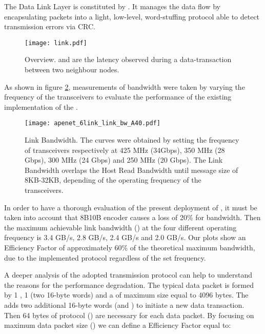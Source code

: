 The Data Link Layer is constituted by . It manages the
data flow by encapsulating packets into a light, low-level,
word-stuffing protocol able to detect transmission errors via CRC.

\begin{figure}[!hbt]
  \centering
  \texttt{[image: link.pdf]}
  \caption{ Overview.  and  are the
  latency observed during a data-transaction between two neighbour
  nodes.}
  \label{fig:link}
\end{figure}


As shown in figure \ref{fig:link_bw}, measurements of bandwidth were
taken by varying the frequency of the transceivers to evaluate the
performance of the existing implementation of the .
 
\begin{figure}[!hbt]
  \centering
  \texttt{[image: apenet\_6link\_link\_bw\_A40.pdf]}
  \caption{\apenetp Link Bandwidth. The curves were obtained by
    setting the frequency of transceivers respectively at 425 MHz
    (34Gbps), 350 MHz (28 Gbps), 300 MHz (24 Gbps) and 250 MHz (20
    Gbps). The Link Bandwidth  overlaps the Host Read
    Bandwidth  until message size of 8KB-32KB,
    depending of the operating frequency of the transceivers.}
  \label{fig:link_bw}
\end{figure}


In order to have a thorough evaluation of the present deployment of
, it must be taken into account that 8B10B encoder
causes a loss of 20\% for bandwidth. Then the maximum achievable link
bandwidth () at the four different operating frequency
is 3.4 GB/s, 2.8 GB/s, 2.4 GB/s and 2.0 GB/s.
Our plots show an Efficiency Factor  of approximately 60\% of
the theoretical maximum bandwidth, due to the implemented protocol
regardless of the set frequency.


A deeper analysis of the adopted transmission protocol can help to
understand the reasons for the performance degradation. The typical
\apenetp data packet is formed by 1 \header, 1 \footer (two 16-byte
words) and a \payload of maximum size equal to 4096 bytes.
The  adds two additional 16-byte words (\magic and
\start) to initiate a new data transaction. Then 64 bytes of protocol
() are necessary for each data packet. By focusing on maximum data
packet size () we can define a Efficiency Factor 
equal to:




